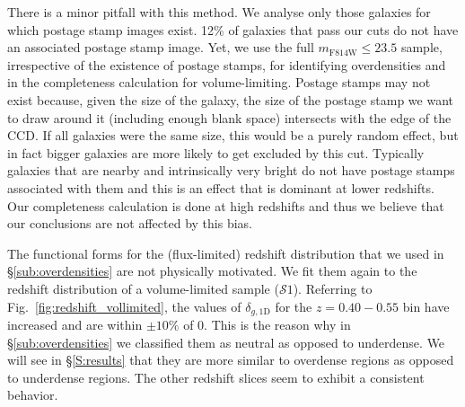 \documentclass[twocolumn,useAMS,usenatbib]{mn2e}
\newcommand{\rachel}[1]{{\textcolor{red}{#1}}}
\newcommand{\arun}[1]{{\textcolor{blue}{#1}}}
\newcommand{\s}{\ensuremath{\mathcal{S}}}
\begin{document}
There is a minor pitfall with this method. We analyse only those galaxies for which postage stamp images exist.
12\% of galaxies that pass our cuts do not have an associated postage stamp image.
Yet, we use the full $m_\text{F814W}\le23.5$ sample, irrespective of the existence of postage stamps, for identifying overdensities and in the completeness calculation for volume-limiting.
Postage stamps may not exist because, given the size of the galaxy, the size of the postage stamp we want to draw around it (including enough blank space) intersects with the edge of the CCD.
If all galaxies were the same size, this would be a purely random effect, but in fact bigger galaxies are more likely to get excluded by this cut. 
Typically galaxies that are nearby and intrinsically very bright do not have postage stamps associated with them and this is an effect that is dominant at lower redshifts. 
Our completeness calculation is done at high redshifts and thus we believe that our conclusions are not affected by this bias. 


The functional forms for the (flux-limited) redshift distribution that we used in \S\ref{sub:overdensities} are not physically motivated. We fit them again to the  
redshift distribution of a volume-limited sample (\s$1$). Referring to Fig.~\ref{fig:redshift_vollimited}, the values of $\delta_{g,\text{1D}}$ for the $z=0.40-0.55$ bin have increased and are within $\pm 10\%$ of 0. This is the reason why in \S\ref{sub:overdensities} we classified them as neutral as opposed to underdense.
We will see in \S\ref{S:results} that they are more similar to overdense regions as opposed to underdense regions.
The other redshift slices seem to exhibit a consistent behavior. 
\end{document}
